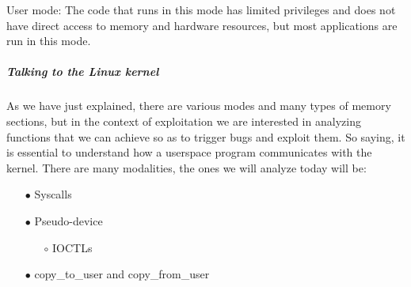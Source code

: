     User mode: The code that runs in this mode has limited privileges and does not have direct access to memory and hardware resources, but most applications are run in this mode.\newline
    \subparagraph{Talking to the Linux kernel}
    As we have just explained, there are various modes and many types of memory sections, but in the context of exploitation we are interested in analyzing functions that we can achieve so as to trigger bugs and exploit them.\newline
    So saying, it is essential to understand how a userspace program communicates with the kernel.\newline
    There are many modalities, the ones we will analyze today will be:\newline
    \begin{itemize}
        \item[$\bullet$] Syscalls
        \item[$\bullet$] Pseudo-device
        \begin{itemize}
            \item[$\circ$] IOCTLs
        \end{itemize}
        \item[$\bullet$] copy\_to\_user and copy\_from\_user

    \end{itemize}

